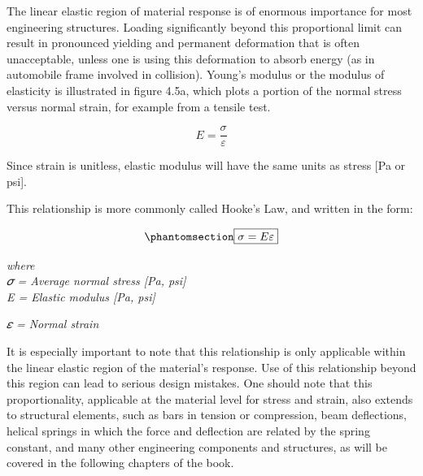\documentclass[
  letterpaper,
  DIV=11,
  numbers=noendperiod]{scrreprt}
\theoremstyle{definition}
\theoremstyle{remark}
\begin{document}
The linear elastic region of material response is of enormous importance
for most engineering structures. Loading significantly beyond this
proportional limit can result in pronounced yielding and permanent
deformation that is often unacceptable, unless one is using this
deformation to absorb energy (as in automobile frame involved in
collision). Young's modulus or the modulus of elasticity is illustrated
in figure 4.5a, which plots a portion of the normal stress versus normal
strain, for example from a tensile test.

\[
E=\frac{\sigma}{\varepsilon}
\]

Since strain is unitless, elastic modulus will have the same units as
stress {[}Pa or psi{]}.

This relationship is more commonly called Hooke's Law, and written in
the form:

\begin{equation}\phantomsection\label{eq-4.1}{
\boxed{\sigma=E \varepsilon}
}\end{equation}

\emph{where}\\
\emph{𝜎 = Average normal stress {[}Pa, psi{]}}\\
\emph{E = Elastic modulus {[}Pa, psi{]}}

\emph{𝜀 = Normal strain}

It is especially important to note that this relationship is only
applicable within the linear elastic region of the material's response.
Use of this relationship beyond this region can lead to serious design
mistakes. One should note that this proportionality, applicable at the
material level for stress and strain, also extends to structural
elements, such as bars in tension or compression, beam deflections,
helical springs in which the force and deflection are related by the
spring constant, and many other engineering components and structures,
as will be covered in the following chapters of the book.
\end{document}

